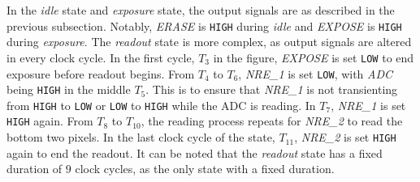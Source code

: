 In the \emph{idle} state and \emph{exposure} state, the output signals are as described in the previous subsection. Notably, \emph{ERASE} is \verb|HIGH| during \emph{idle} and \emph{EXPOSE} is \verb|HIGH| during \emph{exposure}. The \emph{readout} state is more complex, as output signals are altered in every clock cycle. In the first cycle, $T_3$ in the figure, \emph{EXPOSE} is set \verb|LOW| to end exposure before readout begins. From $T_4$ to $T_6$, \emph{NRE\_1} is set \verb|LOW|, with \emph{ADC} being \verb|HIGH| in the middle $T_5$. This is to ensure that \emph{NRE\_1} is not transienting from \verb|HIGH| to \verb|LOW| or \verb|LOW| to \verb|HIGH| while the ADC is reading. In $T_7$, \emph{NRE\_1} is set \verb|HIGH| again. From $T_8$ to $T_{10}$, the reading process repeats for \emph{NRE\_2} to read the bottom two pixels. In the last clock cycle of the state, $T_{11}$, \emph{NRE\_2} is set \verb|HIGH| again to end the readout. It can be noted that the \emph{readout} state has a fixed duration of $9$ clock cycles, as the only state with a fixed duration.
